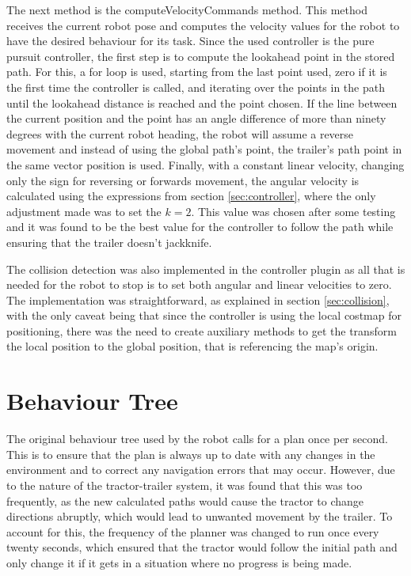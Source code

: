 The next method is the computeVelocityCommands method. This method receives the current 
robot pose and computes the velocity values for the robot to have the desired behaviour 
for its task. Since the used controller is the pure pursuit controller, the first step is 
to compute the lookahead point in the stored path. For this, a for loop is used, starting 
from the last point used, zero if it is the first time the controller is called, and iterating 
over the points in the path until the lookahead distance is reached and the point chosen. 
If the line between the current position and the point has an angle difference of more than 
ninety degrees with the current robot heading, the robot will assume a reverse movement and 
instead of using the global path's point, the trailer's path point in the same vector position 
is used. Finally, with a constant linear velocity, changing only the sign for reversing or 
forwards movement, the angular velocity is calculated using the expressions from section 
\ref{sec:controller}, where the only adjustment made was to set the $k=2$. This value 
was chosen after some testing and it was found to be the best value for the 
controller to follow the path while ensuring that the trailer doesn't jackknife.

The collision detection was also implemented in the controller plugin as all that is 
needed for the robot to stop is to set both angular and linear velocities to zero. The 
implementation was straightforward, as explained in section \ref{sec:collision}, with the 
only caveat being that since the controller is using the local costmap for positioning, 
there was the need to create auxiliary methods to get the transform the local position to 
the global position, that is referencing the map's origin.

\section{Behaviour Tree}
\label{sec:behaviour_tree}

The original behaviour tree used by the robot calls for a plan once per second. This is 
to ensure that the plan is always up to date with any changes in the environment and to 
correct any navigation errors that may occur. However, due to the nature of the tractor-trailer system, 
it was found that this was too frequently, as the new calculated paths would 
cause the tractor to change directions abruptly, which would lead to unwanted movement by the trailer. 
To account for this, the frequency of the planner was changed to run once every twenty seconds, 
which ensured that the tractor would follow the initial path and only change it if 
it gets in a situation where no progress is being made.